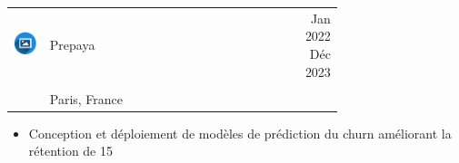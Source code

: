 \documentclass{article}
\begin{document}
\begin{paracol}{2}
\colorbox{maincolor}{%
  \begin{minipage}{\linewidth}
    \begin{tabular}{@{}lp{0.72\linewidth}r}
      \begin{minipage}{0.05\linewidth}
        \includegraphics[width=\linewidth]{picon.png}
      \end{minipage} & 
      {Prepaya} &  
      {\footnotesize {Jan 2022} {Déc 2023} } \\[-10pt]
      & {\color{sidetext}{Data Scientist}} & \\
      & {\small {Paris, France} } & \\
    \end{tabular}
\begin{itemize}
    \item Conception et déploiement de modèles de prédiction du churn améliorant la rétention de 15 %
\end{itemize}
  \end{minipage}%
}

~ \\[-6pt]


\end{paracol}
\end{document}
